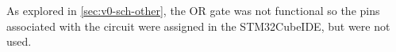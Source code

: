 As explored in \autoref{sec:v0-sch-other}, the OR gate was not functional so the pins associated with the circuit were assigned in the STM32CubeIDE, but were not used.